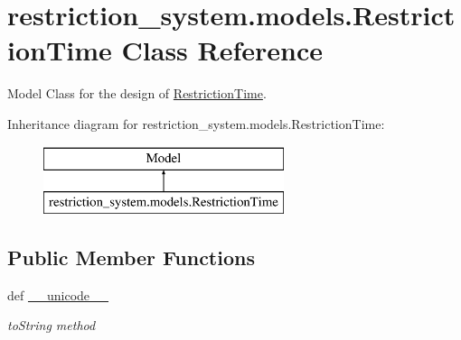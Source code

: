 \hypertarget{classrestriction__system_1_1models_1_1RestrictionTime}{}\section{restriction\+\_\+system.\+models.\+Restriction\+Time Class Reference}
\label{classrestriction__system_1_1models_1_1RestrictionTime}


Model Class for the design of \hyperlink{classrestriction__system_1_1models_1_1RestrictionTime}{Restriction\+Time}.  


Inheritance diagram for restriction\+\_\+system.\+models.\+Restriction\+Time\+:\begin{figure}[H]
\begin{center}
\leavevmode
\includegraphics[height=2.000000cm]{classrestriction__system_1_1models_1_1RestrictionTime}
\end{center}
\end{figure}
\subsection*{Public Member Functions}
\begin{DoxyCompactItemize}
\item 
def \hyperlink{classrestriction__system_1_1models_1_1RestrictionTime_af670139227d0dd75a9eb411108f2e652}{\+\_\+\+\_\+unicode\+\_\+\+\_\+}
\begin{DoxyCompactList}\small\item\em to\+String method \end{DoxyCompactList}\end{DoxyCompactItemize}
